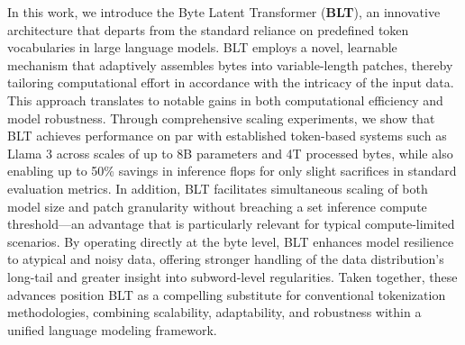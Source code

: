 In this work, we introduce the Byte Latent Transformer (\textbf{BLT}), an innovative architecture that departs from the standard reliance on predefined token vocabularies in large language models. {\textsc BLT} employs a novel, learnable mechanism that adaptively assembles bytes into variable-length patches, thereby tailoring computational effort in accordance with the intricacy of the input data. This approach translates to notable gains in both computational efficiency and model robustness. Through comprehensive scaling experiments, we show that {\textsc BLT} achieves performance on par with established token-based systems such as Llama 3 across scales of up to 8B parameters and 4T processed bytes, while also enabling up to 50\% savings in inference flops for only slight sacrifices in standard evaluation metrics. In addition, {\textsc BLT} facilitates simultaneous scaling of both model size and patch granularity without breaching a set inference compute threshold—an advantage that is particularly relevant for typical compute-limited scenarios. By operating directly at the byte level, {\textsc BLT} enhances model resilience to atypical and noisy data, offering stronger handling of the data distribution’s long-tail and greater insight into subword-level regularities. Taken together, these advances position {\textsc BLT} as a compelling substitute for conventional tokenization methodologies, combining scalability, adaptability, and robustness within a unified language modeling framework.

